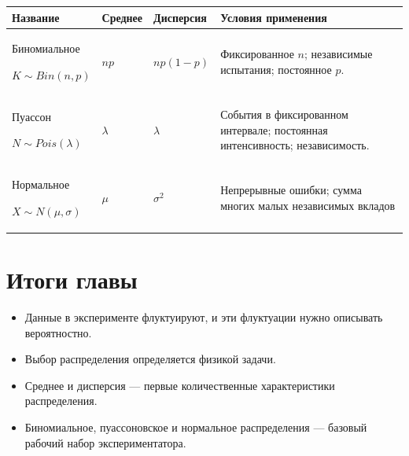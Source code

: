 \documentclass[
  russian,
  letterpaper,
]{scrbook}
\newcounter{none} %
\providecommand{\tightlist}{%
  \setlength{\itemsep}{0pt}\setlength{\parskip}{0pt}}
\begin{document}
{\def\LTcaptype{none} %
\begin{longtable}[]{@{}
  >{\centering\arraybackslash}p{}
  >{\centering\arraybackslash}p{}
  >{\centering\arraybackslash}p{}
  >{\centering\arraybackslash}p{}@{}}
\toprule\noalign{}
\begin{minipage}[b]{\linewidth}\centering
Название
\end{minipage} & \begin{minipage}[b]{\linewidth}\centering
Среднее
\end{minipage} & \begin{minipage}[b]{\linewidth}\centering
Дисперсия
\end{minipage} & \begin{minipage}[b]{\linewidth}\centering
Условия применения
\end{minipage} \\
\midrule\noalign{}
\endhead
\bottomrule\noalign{}
\endlastfoot
Биномиальное

\(K\sim Bin(n,p)\) & \(np\) & \(np(1-p)\) & Фиксированное \(n\);
независимые испытания; постоянное \(p\). \\
Пуассон

\(N\sim Pois(\lambda)\) & \(\lambda\) & \(\lambda\) & События в
фиксированном интервале; постоянная интенсивность; независимость. \\
Нормальное

\(X\sim N(\mu,\sigma)\) & \(\mu\) & \(\sigma^2\) & Непрерывные ошибки;
сумма многих малых независимых вкладов \\
\end{longtable}
}

\section{Итоги
главы}\label{ux438ux442ux43eux433ux438-ux433ux43bux430ux432ux44b-1}

\begin{itemize}
\tightlist
\item
  Данные в эксперименте флуктуируют, и эти флуктуации нужно описывать
  вероятностно.
\item
  Выбор распределения определяется физикой задачи.
\item
  Среднее и дисперсия --- первые количественные характеристики
  распределения.
\item
  Биномиальное, пуассоновское и нормальное распределения --- базовый
  рабочий набор экспериментатора.
\end{itemize}
\end{document}

